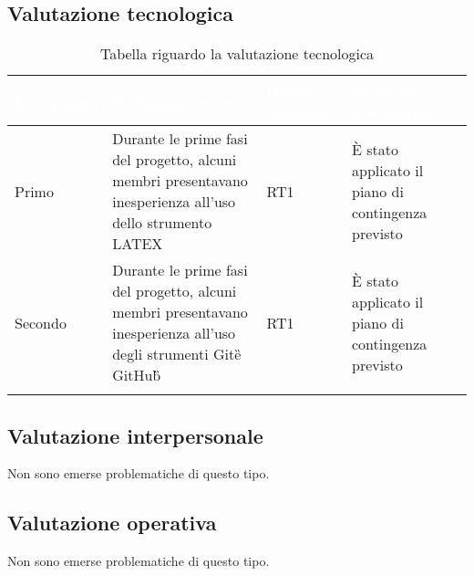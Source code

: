 \subsection{Valutazione tecnologica}
{
    \setlength{\freewidth}{\dimexpr\textwidth-10\tabcolsep}
    \renewcommand{\arraystretch}{1.5}
    \centering
    \setlength{\aboverulesep}{0pt}
    \setlength{\belowrulesep}{0pt}
    \begin{longtable}{C{.16\freewidth} C{.38\freewidth} C{.14\freewidth} C{.38\freewidth}}
       \toprule
    \textcolor{white}{\textbf{Incremento}}&
    \textcolor{white}{\textbf{Problema emerso}}&
    \textcolor{white}{\textbf{Rischio associato}}&
    \textcolor{white}{\textbf{Soluzione migliorativa}}\\	
    \toprule
    \endhead
    
Primo & Durante le prime fasi del progetto, alcuni membri presentavano inesperienza all'uso dello strumento LATEX & RT1 & È stato applicato il piano di contingenza
previsto \\
Secondo & Durante le prime fasi del progetto, alcuni membri presentavano inesperienza all'uso degli strumenti Git\G e GitHub\G & RT1 & È stato applicato il piano di contingenza
previsto\\

 \bottomrule
 \caption{Tabella riguardo la valutazione tecnologica}
\end{longtable}
}

\subsection{Valutazione interpersonale}
Non sono emerse problematiche di questo tipo. 

\subsection{Valutazione operativa}
Non sono emerse problematiche di questo tipo.
